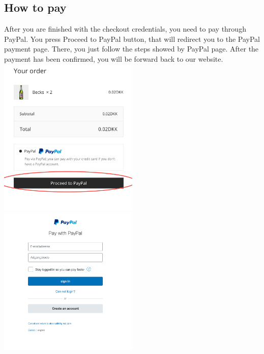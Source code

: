 \documentclass[12p]{article}
\begin{document}
\subsection{How to pay}
After you are finished with the checkout credentials, you need to pay through PayPal. You press Proceed to PayPal button, that will redirect you to the PayPal payment page. There, you just follow the steps showed by PayPal page. After the payment has been confirmed, you will be forward back to our website.
\\
\includegraphics[width=0.5\textwidth]{11.png}
\includegraphics[width=0.5\textwidth]{12.png}


\newpage
\end{document}
